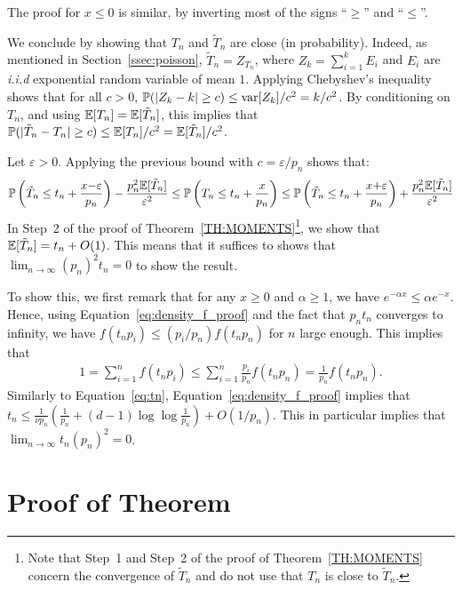\documentclass{aptpub}
\newcommand\expect[1]{\mathchoice{\bexpect{#1}}{\sexpect{#1}}{\sexpect{#1}}{\sexpect{#1}}}
\newcommand\bexpect[1]{\mathbb{E}\left[#1\right]}
\newcommand\sexpect[1]{\mathbb{E}[#1]}
\newcommand\proba[1]{\mathchoice{\bproba{#1}}{\sproba{#1}}{\sproba{#1}}{\sproba{#1}}}
\newcommand\bproba[1]{\mathbb{P}\left(#1\right)}
\newcommand\sproba[1]{\mathbb{P}(#1)}
\newcommand\abs[1]{\mathchoice{\babs{#1}}{\sabs{#1}}{\sabs{#1}}{\sabs{#1}}}
\newcommand\babs[1]{\left|#1\right|}
\newcommand\sabs[1]{|#1|}
\begin{document}
  The proof for $x\le0$ is similar, by inverting most of the
  signs ``$\ge$'' and ``$\le$''.

  \medskip We conclude by showing that $T_n$ and $\tilde T_n$ are
  close (in probability). Indeed, as mentioned in
  Section~\ref{ssec:poisson}, $\tilde T_n=Z_{T_n}$, where
  $Z_{k}=\sum_{i=1}^kE_i$ and $E_i$ are \emph{i.i.d} exponential
  random variable of mean $1$.  Applying Chebyshev's inequality shows
  that for all $c>0$,
  $\proba{\abs{Z_k-k}\ge c}\le \var[Z_k]/c^2=k/c^2$. 
By conditioning on $T_n$, and using $\expect{T_n}=\expect{\tilde T_n}$, this implies that 
  $\proba{\abs{\tilde{T}_n-T_n}\ge c}\le \expect{T_n}/c^2 = \expect{\tilde T_n}/c^2$.

  Let $\varepsilon>0$. Applying the previous bound with
  $c=\varepsilon/p_n$ shows that:
  \begin{align*}
    \proba{\tilde T_n\le t_n + \frac{x{-}\varepsilon}{p_n}}
    - \frac{p_n^2\expect{\tilde T_n}}{\varepsilon^2}
    \le\proba{T_n\le t_n + \frac{x}{p_n}}
    \le\proba{\tilde T_n\le t_n + \frac{x{+}\varepsilon}{p_n}}
    + \frac{p_n^2\expect{\tilde T_n}}{\varepsilon^2}
  \end{align*}
  In Step~2 of the proof of Theorem~\ref{TH:MOMENTS}\footnote{Note
    that Step~1 and Step~2 of the proof of Theorem~\ref{TH:MOMENTS}
    concern the convergence of $\tilde T_n$ and do not use that $T_n$
    is close to $\tilde T_n$.}, we show that
  $\expect{\tilde T_n}=t_n + O(1)$. This means that it suffices to
  shows that $\lim_{n\to\infty}(p_n)^2t_n=0$ to show the result.
  
  To show this, we first remark that for any $x\ge0$ and $\alpha\ge1$,
  we have 
  $e^{-\alpha x}\le \alpha e^{-x}$. Hence, using
  Equation~\eqref{eq:density_f_proof} and the fact that $p_nt_n$
  converges to infinity, we have $f(t_np_i)\le (p_i/p_n)f(t_np_n)$ for
  $n$ large enough. This implies that 
  \begin{align*}
    1=\sum_{i=1}^n f(t_np_i) \le \sum_{i=1}^n \frac{p_i}{p_n}
    f(t_np_n) = \frac{1}{p_n}f(t_np_n). 
  \end{align*}
  Similarly to Equation~\eqref{eq:tn},
  Equation~\eqref{eq:density_f_proof} implies that
  $t_n \le \frac{1}{\nu p_n}(\frac1{p_n}+(d-1)\log\log
  \frac1{p_n})+O(1/p_n)$.
  This in particular implies that $\lim_{n\to\infty}t_n(p_n)^2=0$.

  \section{Proof of Theorem \protect{\ref{TH:MOMENTS}}}
  \label{sec:proof2}
  
\end{document}
